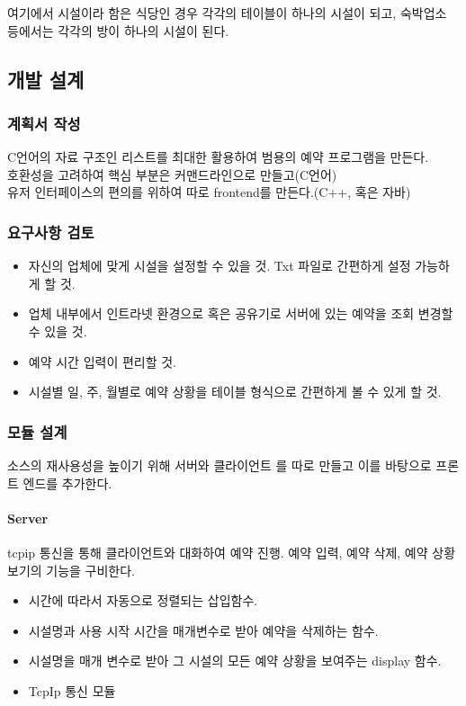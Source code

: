 \documentclass[12pt,a4paper]{report}
\begin{document}
여기에서 시설이라 함은 식당인 경우 각각의 테이블이 하나의 시설이 되고, 숙박업소 등에서는 각각의 방이 하나의 시설이 된다.
\subsection{개발 설계}
\subsubsection{계획서 작성}
C언어의 자료 구조인 리스트를 최대한 활용하여 범용의 예약 프로그램을 만든다.\\
호환성을 고려하여 핵심 부분은 커맨드라인으로 만들고(C언어) \\
유저 인터페이스의 편의를 위하여 따로 frontend를 만든다.(C++, 혹은 자바)

\subsubsection{요구사항 검토}
\begin{itemize}
\item 자신의 업체에 맞게 시설을 설정할 수 있을 것. Txt 파일로 간편하게 설정 가능하게 할 것.
\item 업체 내부에서 인트라넷 환경으로 혹은 공유기로 서버에 있는 예약을 조회 변경할 수 있을 것.
\item 예약 시간 입력이 편리할 것. 

\item 시설별 일, 주, 월별로 예약 상황을 테이블 형식으로 간편하게 볼 수 있게 할 것.
\end{itemize}
\subsubsection{모듈 설계}
소스의 재사용성을 높이기 위해 서버와 클라이언트 를 따로 만들고 이를 바탕으로 프론트 엔드를 추가한다.
\paragraph{Server}
tcpip 통신을 통해 클라이언트와 대화하여 예약 진행.
예약 입력, 예약 삭제, 예약 상황 보기의 기능을 구비한다.
\begin{itemize}
	\item 시간에 따라서 자동으로 정렬되는 삽입함수.
	\item 시설명과 사용 시작 시간을 매개변수로 받아 예약을 삭제하는 함수.
	\item 시설명을 매개 변수로 받아 그 시설의 모든 예약 상황을 보여주는 display 함수.
	\item TcpIp 통신 모듈
\end{itemize}
\end{document}
